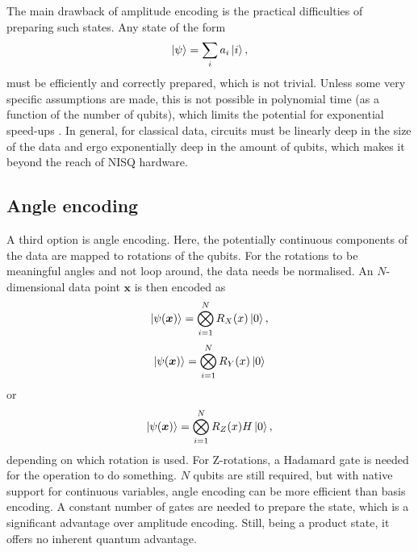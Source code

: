 The main drawback of amplitude encoding is the practical difficulties of preparing such states. Any state of the form
\begin{equation}
    \ket{\psi} = \sum_{i} a_i \ket{i},
\end{equation}
must be efficiently and correctly prepared, which is not trivial. Unless some very specific assumptions are made, this is not possible in polynomial time (as a function of the number of qubits), which limits the potential for exponential speed-ups \cite{textbook}. In general, for classical data, circuits must be linearly deep in the size of the data and ergo exponentially deep in the amount of qubits, which makes it beyond the reach of NISQ hardware.

\subsection{Angle encoding}
A third option is angle encoding. Here, the potentially continuous components of the data are mapped to rotations of the qubits. For the rotations to be meaningful angles and not loop around, the data needs be normalised. An $N$-dimensional data point $\bm{x}$ is then encoded as
\begin{equation}
    \ket{\psi(\bm{x})} = \bigotimes_{i=1}^{N} R_X(x) \ket{0},
\end{equation}
\begin{equation}
    \ket{\psi(\bm{x})} = \bigotimes_{i=1}^{N} R_Y(x) \ket{0}
\end{equation}
or
\begin{equation}
    \ket{\psi(\bm{x})} = \bigotimes_{i=1}^{N} R_Z(x) H \ket{0},
\end{equation}
depending on which rotation is used. For Z-rotations, a Hadamard gate is needed for the operation to do something. $N$ qubits are still required, but with native support for continuous variables, angle encoding can be more efficient than basis encoding. A constant number of gates are needed to prepare the state, which is a significant advantage over amplitude encoding. Still, being a product state, it offers no inherent quantum advantage.


